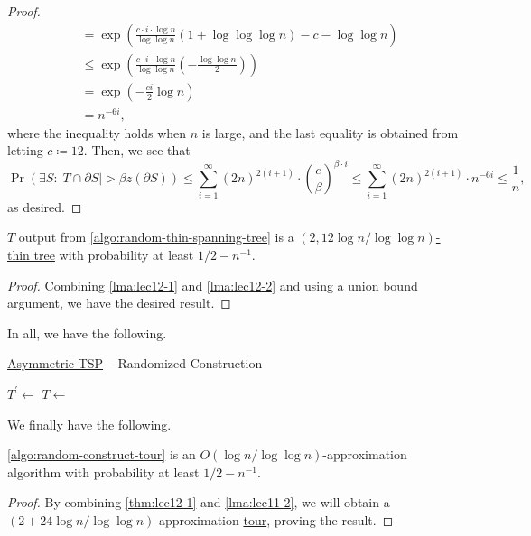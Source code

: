 \begin{proof}
\[\begin{split}
			&= \exp \left( \frac{c\cdot i\cdot \log n}{\log \log n}(1 + \log \log \log n) - c - \log \log n \right) \\
			&\leq \exp \left( \frac{c\cdot i\cdot \log n}{\log \log n} \left( - \frac{\log \log n}{2} \right) \right) \\
			&= \exp \left( - \frac{ci}{2}\log n \right) \\
			&= n^{-6i},
		\end{split}
	\]
	where the inequality holds when \(n\) is large, and the last equality is obtained from letting \(c \coloneqq 12\). Then, we see that
	\[
		\Pr(\exists S\colon \left\vert T \cap \partial S \right\vert > \beta z(\partial S))
		\leq \sum_{i=1}^{\infty} (2n)^{2(i+1)} \cdot \left( \frac{e}{\beta } \right) ^{\beta \cdot i}
		\leq \sum_{i=1}^{\infty} (2n)^{2(i+1)} \cdot n^{-6i} \leq \frac{1}{n},
	\]
	as desired.
\end{proof}

\begin{theorem}\label{thm:lec12-1}
	\(T\) output from \autoref{algo:random-thin-spanning-tree} is a \hyperref[def:thin]{\((2, 12\log n / \log \log n)\)-thin tree} with probability at least \(1 / 2 - n^{-1} \).
\end{theorem}
\begin{proof}
	Combining \autoref{lma:lec12-1} and \autoref{lma:lec12-2} and using a union bound argument, we have the desired result.
\end{proof}

In all, we have the following.

\begin{algorithm}[H]\label{algo:random-construct-tour}
	\DontPrintSemicolon
	\caption{\hyperref[prb:ATSP]{Asymmetric TSP} -- Randomized Construction}
	\BlankLine
	\(T^\prime\gets\)\;
	\(T\gets\)\;
	\;
\end{algorithm}

We finally have the following.

\begin{theorem}
	\autoref{algo:random-construct-tour} is an \(O(\log n / \log \log n)\)-approximation algorithm with probability at least \(1 / 2 - n ^{-1} \).
\end{theorem}
\begin{proof}
	By combining \autoref{thm:lec12-1} and \autoref{lma:lec11-2}, we will obtain a \((2 + 24\log n / \log \log n)\)-approximation \hyperref[def:tour]{tour}, proving the result.
\end{proof}


